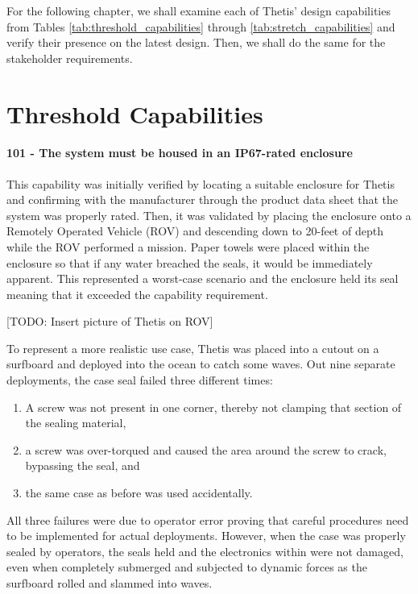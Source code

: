 For the following chapter, we shall examine each of Thetis' design capabilities from Tables \ref{tab:threshold_capabilities} through \ref{tab:stretch_capabilities} and verify their presence on the latest design.
Then, we shall do the same for the stakeholder requirements.

\section{Threshold Capabilities}

\paragraph*{101 - The system must be housed in an IP67-rated enclosure} This capability was initially verified by locating a suitable enclosure for Thetis and confirming with the manufacturer through the product data sheet that the system was properly rated.
Then, it was validated by placing the enclosure onto a Remotely Operated Vehicle (ROV) and descending down to 20-feet of depth while the ROV performed a mission.
Paper towels were placed within the enclosure so that if any water breached the seals, it would be immediately apparent.
This represented a worst-case scenario and the enclosure held its seal meaning that it exceeded the capability requirement.

[TODO: Insert picture of Thetis on ROV]

To represent a more realistic use case, Thetis was placed into a cutout on a surfboard and deployed into the ocean to catch some waves.
Out nine separate deployments, the case seal failed three different times:

\begin{enumerate}
    \item A screw was not present in one corner, thereby not clamping that section of the sealing material, 
    \item a screw was over-torqued and caused the area around the screw to crack, bypassing the seal, and 
    \item the same case as before was used accidentally.
\end{enumerate}

All three failures were due to operator error proving that careful procedures need to be implemented for actual deployments.
However, when the case was properly sealed by operators, the seals held and the electronics within were not damaged, even when completely submerged and subjected to dynamic forces as the surfboard rolled and slammed into waves.

